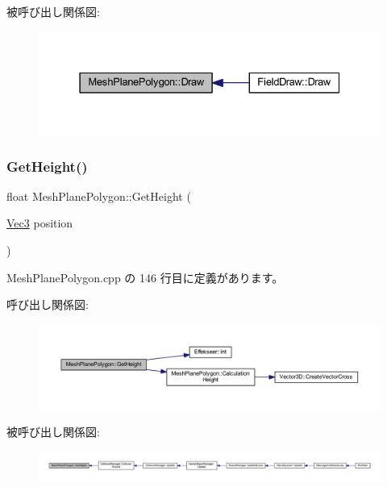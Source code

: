 被呼び出し関係図\+:\nopagebreak
\begin{figure}[H]
\begin{center}
\leavevmode
\includegraphics[width=331pt]{class_mesh_plane_polygon_a813d5d6897ec0ce2b672cd6e1360e281_icgraph}
\end{center}
\end{figure}
\mbox{\label{class_mesh_plane_polygon_ac04d763b16a962f00c99e3354e45f320}} 
\subsubsection{\texorpdfstring{Get\+Height()}{GetHeight()}}
{\footnotesize\ttfamily float Mesh\+Plane\+Polygon\+::\+Get\+Height (\begin{DoxyParamCaption}\item[{\mbox{\hyperlink{_vector3_d_8h_ab16f59e4393f29a01ec8b9bbbabbe65d}{Vec3}}}]{position }\end{DoxyParamCaption})}



 Mesh\+Plane\+Polygon.\+cpp の 146 行目に定義があります。

呼び出し関係図\+:\nopagebreak
\begin{figure}[H]
\begin{center}
\leavevmode
\includegraphics[width=350pt]{class_mesh_plane_polygon_ac04d763b16a962f00c99e3354e45f320_cgraph}
\end{center}
\end{figure}
被呼び出し関係図\+:
\nopagebreak
\begin{figure}[H]
\begin{center}
\leavevmode
\includegraphics[width=350pt]{class_mesh_plane_polygon_ac04d763b16a962f00c99e3354e45f320_icgraph}
\end{center}
\end{figure}
\mbox{\label{class_mesh_plane_polygon_a1188cf0072e000227ecce6210ba2778c}} 
